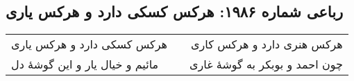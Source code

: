 \begin{center}
\section*{رباعی شماره ۱۹۸۶: هرکس کسکی دارد و هرکس یاری}
\label{sec:1986}
\begin{longtable}{l p{0.5cm} r}
هرکس کسکی دارد و هرکس یاری
&&
هرکس هنری دارد و هرکس کاری
\\
مائیم و خیال یار و این گوشهٔ دل
&&
چون احمد و بوبکر به گوشهٔ غاری
\\
\end{longtable}
\end{center}

